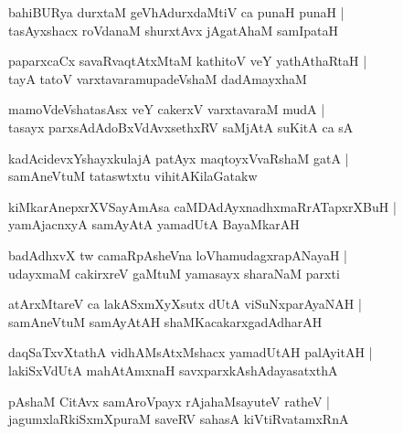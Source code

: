 \begin{shloka}
bahiBURya durxtaM geVhAdurxdaMtiV ca punaH punaH |\\
tasAyxshacx roVdanaM shurxtAvx jAgatAhaM samIpataH
\end{shloka}

\begin{shloka}
paparxcaCx savaRvaqtAtxMtaM kathitoV veY yathAthaRtaH |\\
tayA tatoV varxtavaramupadeVshaM dadAmayxhaM
\end{shloka}

\begin{shloka}
mamoVdeVshatasAsx veY cakerxV varxtavaraM mudA |\\
tasayx parxsAdAdoBxVdAvxsethxRV saMjAtA suKitA ca sA
\end{shloka}

\begin{shloka}
kadAcidevxYshayxkulajA patAyx maqtoyxVvaRshaM gatA |\\
samAneVtuM tataswtxtu vihitAKilaGatakw
\end{shloka}

\begin{shloka}
kiMkarAnepxrXVSayAmAsa caMDAdAyxnadhxmaRrATapxrXBuH |\\
yamAjacnxyA samAyAtA yamadUtA BayaMkarAH 
\end{shloka}

\begin{shloka}
badAdhxvX tw  camaRpAsheVna loVhamudagxrapANayaH |\\
udayxmaM cakirxreV gaMtuM yamasayx sharaNaM parxti
\end{shloka}

\begin{shloka}
atArxMtareV ca lakASxmXyXsutx dUtA viSuNxparAyaNAH |\\
samAneVtuM samAyAtAH shaMKacakarxgadAdharAH
\end{shloka}

\begin{shloka}
daqSaTxvXtathA vidhAMsAtxMshacx yamadUtAH palAyitAH |\\
lakiSxVdUtA mahAtAmxnaH savxparxkAshAdayasatxthA
\end{shloka}

\begin{shloka}
pAshaM CitAvx samAroVpayx rAja{ha}MsayuteV ratheV |\\
jagumxlaRkiSxmXpuraM saveRV sahasA kiVtiRvatamxRnA
\end{shloka}

